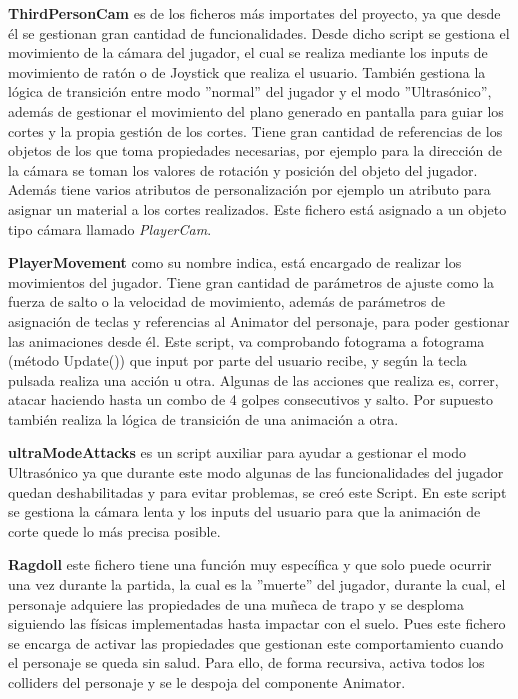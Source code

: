 \textbf{ThirdPersonCam} es de los ficheros más importates del proyecto, ya que desde él se gestionan gran cantidad de funcionalidades. Desde dicho script se gestiona el movimiento de la cámara del jugador, el cual se realiza mediante los inputs de movimiento de ratón o de Joystick que realiza el usuario. También gestiona la lógica de transición entre modo ''normal'' del jugador y el modo ''Ultrasónico'', además de gestionar el movimiento del plano generado en pantalla para guiar los cortes y la propia gestión de los cortes. Tiene gran cantidad de referencias de los objetos de los que toma propiedades necesarias, por ejemplo para la dirección de la cámara se toman los valores de rotación y posición del objeto del jugador. Además tiene varios atributos de personalización por ejemplo un atributo para asignar un material a los cortes realizados. Este fichero está asignado a un objeto tipo cámara llamado \textit{PlayerCam}.

\textbf{PlayerMovement} como su nombre indica, está encargado de realizar los movimientos del jugador. Tiene gran cantidad de parámetros de ajuste como la fuerza de salto o la velocidad de movimiento, además de parámetros de asignación de teclas y referencias al Animator del personaje, para poder gestionar las animaciones desde él. Este script, va comprobando fotograma a fotograma (método Update()) que input por parte del usuario recibe, y según la tecla pulsada realiza una acción u otra. Algunas de las acciones que realiza es, correr, atacar haciendo hasta un combo de 4 golpes consecutivos y salto. Por supuesto también realiza la lógica de transición de una animación a otra.

\textbf{ultraModeAttacks} es un script auxiliar para ayudar a gestionar el modo Ultrasónico ya que durante este modo algunas de las funcionalidades del jugador quedan deshabilitadas y para evitar problemas, se creó este Script. En este script se gestiona la cámara lenta y los inputs del usuario para que la animación de corte quede lo más precisa posible.

\textbf{Ragdoll} este fichero tiene una función muy específica y que solo puede ocurrir una vez durante la partida, la cual es la ''muerte'' del jugador, durante la cual, el personaje adquiere las propiedades de una muñeca de trapo y se desploma siguiendo las físicas implementadas hasta impactar con el suelo. Pues este fichero se encarga de activar las propiedades que gestionan este comportamiento cuando el personaje se queda sin salud. Para ello, de forma recursiva, activa todos los colliders del personaje y se le despoja del componente Animator.

